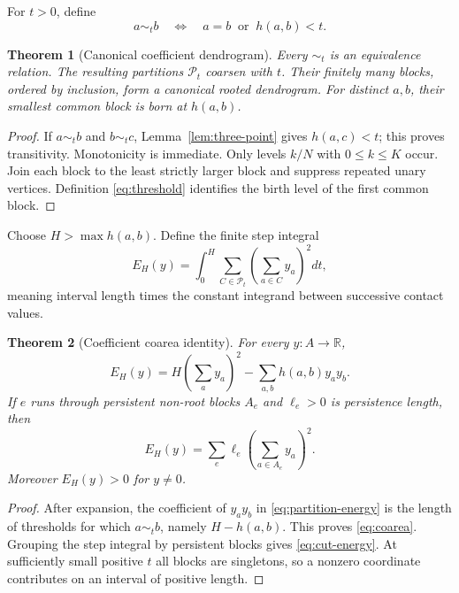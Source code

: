 \documentclass[11pt,a4paper]{amsart}
\theoremstyle{plain}
\newtheorem{theorem}{Theorem}[section]
\theoremstyle{definition}
\newcommand{\RR}{\mathbb R}
\newcommand{\Pcal}{\mathcal P}
\begin{document}
For $t>0$, define
\begin{equation}\label{eq:threshold}
              a\sim_t b\quad\Longleftrightarrow\quad a=b\ \text{ or }\ h(a,b)<t.
\end{equation}

\begin{theorem}[Canonical coefficient dendrogram]\label{thm:dendrogram}
Every $\sim_t$ is an equivalence relation.  The resulting partitions $\Pcal_t$ coarsen with $t$.
Their finitely many blocks, ordered by inclusion, form a canonical rooted dendrogram.  For
distinct $a,b$, their smallest common block is born at $h(a,b)$.
\end{theorem}

\begin{proof}
If $a\sim_t b$ and $b\sim_t c$, Lemma~\ref{lem:three-point} gives $h(a,c)<t$; this proves
transitivity.  Monotonicity is immediate.  Only levels $k/N$ with $0\leq k\leq K$ occur.  Join
each block to the least strictly larger block and suppress repeated unary vertices.  Definition
\eqref{eq:threshold} identifies the birth level of the first common block.
\end{proof}

Choose $H>\max h(a,b)$.  Define the finite step integral
\begin{equation}\label{eq:partition-energy}
 E_H(y)=\int_0^H\sum_{C\in\Pcal_t}\left(\sum_{a\in C}y_a\right)^2dt,
\end{equation}
meaning interval length times the constant integrand between successive contact values.

\begin{theorem}[Coefficient coarea identity]\label{thm:coarea}
For every $y:A\to\RR$,
\begin{equation}\label{eq:coarea}
 E_H(y)=H\left(\sum_ay_a\right)^2-\sum_{a,b}h(a,b)y_ay_b.
\end{equation}
If $e$ runs through persistent non-root blocks $A_e$ and $\ell_e>0$ is persistence length, then
\begin{equation}\label{eq:cut-energy}
                         E_H(y)=\sum_e\ell_e\left(\sum_{a\in A_e}y_a\right)^2.
\end{equation}
Moreover $E_H(y)>0$ for $y\ne0$.
\end{theorem}

\begin{proof}
After expansion, the coefficient of $y_ay_b$ in \eqref{eq:partition-energy} is the length of
thresholds for which $a\sim_t b$, namely $H-h(a,b)$.  This proves \eqref{eq:coarea}.  Grouping the
step integral by persistent blocks gives \eqref{eq:cut-energy}.  At sufficiently small positive
$t$ all blocks are singletons, so a nonzero coordinate contributes on an interval of positive
length.
\end{proof}
\end{document}
